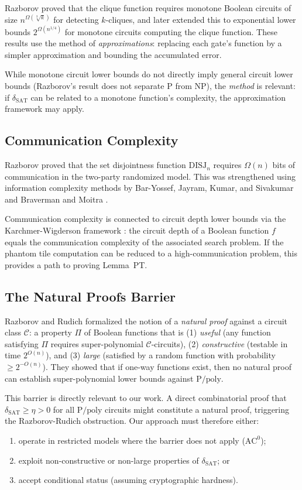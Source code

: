 \documentclass[11pt]{article}
\theoremstyle{definition}
\theoremstyle{remark}
\newcommand{\calC}{\mathcal{C}}
\newcommand{\Ppoly}{\mathrm{P/poly}}
\newcommand{\ACz}{\mathrm{AC}^0}
\newcommand{\dSAT}{\delta_{\mathrm{SAT}}}
\begin{document}
Razborov \cite{Raz} proved that the clique function requires monotone
Boolean circuits of size $n^{\Omega(\sqrt[3]{k})}$ for detecting
$k$-cliques, and later \cite{Raz85b} extended this to exponential
lower bounds $2^{\Omega(n^{1/4})}$ for monotone circuits computing
the clique function.  These results use the method of
\emph{approximations}: replacing each gate's function by a simpler
approximation and bounding the accumulated error.

While monotone circuit lower bounds do not directly imply general circuit
lower bounds (Razborov's result does not separate P from NP), the
\emph{method} is relevant: if $\dSAT$ can be related to a monotone
function's complexity, the approximation framework may apply.

\subsection{Communication Complexity}

Razborov \cite{Raz2} proved that the set disjointness function
$\mathrm{DISJ}_n$ requires $\Omega(n)$ bits of communication in the
two-party randomized model.  This was strengthened using information
complexity methods by Bar-Yossef, Jayram, Kumar, and Sivakumar
\cite{BJKS04} and Braverman and Moitra \cite{BM13}.

Communication complexity is connected to circuit depth lower bounds
via the Karchmer-Wigderson framework \cite{KW}: the circuit depth of
a Boolean function $f$ equals the communication complexity of the
associated search problem.  If the phantom tile computation can be
reduced to a high-communication problem, this provides a path to
proving Lemma~PT.

\subsection{The Natural Proofs Barrier}

Razborov and Rudich \cite{RR} formalized the notion of a \emph{natural
proof} against a circuit class $\calC$: a property $\Pi$ of Boolean
functions that is (1) \emph{useful} (any function satisfying $\Pi$
requires super-polynomial $\calC$-circuits), (2) \emph{constructive}
(testable in time $2^{O(n)}$), and (3) \emph{large} (satisfied by a
random function with probability $\geq 2^{-O(n)}$).  They showed that
if one-way functions exist, then no natural proof can establish
super-polynomial lower bounds against $\Ppoly$.

This barrier is directly relevant to our work.  A direct combinatorial
proof that $\dSAT \geq \eta > 0$ for all $\Ppoly$ circuits might
constitute a natural proof, triggering the Razborov-Rudich obstruction.
Our approach must therefore either:
\begin{enumerate}[label=(\alph*)]
  \item operate in restricted models where the barrier does not apply ($\ACz$);
  \item exploit non-constructive or non-large properties of $\dSAT$; or
  \item accept conditional status (assuming cryptographic hardness).
\end{enumerate}
\end{document}
